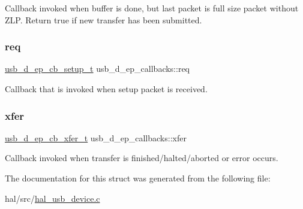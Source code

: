 Callback invoked when buffer is done, but last packet is full size packet without Z\+LP. Return {\ttfamily true} if new transfer has been submitted. \mbox{\label{structusb__d__ep__callbacks_a9cd74e1e1e8789bb7777b564c6f90201}} 
\subsubsection{\texorpdfstring{req}{req}}
{\footnotesize\ttfamily \hyperlink{group__doc__driver__hal__usb__device_ga9b29643c53a553c9b458a251bac3599a}{usb\+\_\+d\+\_\+ep\+\_\+cb\+\_\+setup\+\_\+t} usb\+\_\+d\+\_\+ep\+\_\+callbacks\+::req}

Callback that is invoked when setup packet is received. \mbox{\label{structusb__d__ep__callbacks_ab92a8b2dffd65936e30a1a7ab8471ec5}} 
\subsubsection{\texorpdfstring{xfer}{xfer}}
{\footnotesize\ttfamily \hyperlink{group__doc__driver__hal__usb__device_gae62eea86879f5c1995f1ca99f095e7ab}{usb\+\_\+d\+\_\+ep\+\_\+cb\+\_\+xfer\+\_\+t} usb\+\_\+d\+\_\+ep\+\_\+callbacks\+::xfer}

Callback invoked when transfer is finished/halted/aborted or error occurs. 

The documentation for this struct was generated from the following file\+:\begin{DoxyCompactItemize}
\item 
hal/src/\hyperlink{hal__usb__device_8c}{hal\+\_\+usb\+\_\+device.\+c}\end{DoxyCompactItemize}
